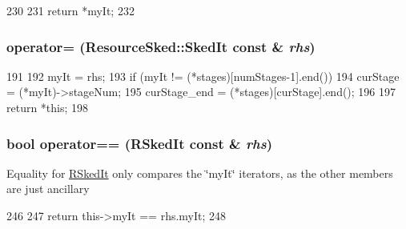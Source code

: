 \begin{DoxyCode}
230     {
231         return *myIt;
232     }
\end{DoxyCode}
\hypertarget{classRSkedIt_aa89a0d19c98c20f4266d96974669be94}{
\subsubsection[{operator=}]{ operator= ({\bf ResourceSked::SkedIt} const \& {\em rhs})}}
\label{classRSkedIt_aa89a0d19c98c20f4266d96974669be94}



\begin{DoxyCode}
191     {
192         myIt = rhs;
193         if (myIt != (*stages)[numStages-1].end()) {
194             curStage = (*myIt)->stageNum;
195             curStage_end = (*stages)[curStage].end();
196         }
197         return *this;
198     }
\end{DoxyCode}
\hypertarget{classRSkedIt_ae14e85b1dd1edd4d43e02e1752a53128}{
\subsubsection[{operator==}]{\setlength{\rightskip}{0pt plus 5cm}bool operator== ({\bf RSkedIt} const \& {\em rhs})}}
\label{classRSkedIt_ae14e85b1dd1edd4d43e02e1752a53128}
Equality for \hyperlink{classRSkedIt}{RSkedIt} only compares the \char`\"{}myIt\char`\"{} iterators, as the other members are just ancillary 


\begin{DoxyCode}
246     {
247         return this->myIt == rhs.myIt;
248     }
\end{DoxyCode}



